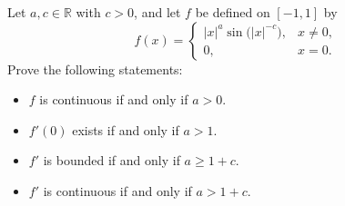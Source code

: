\documentclass{article}
\begin{document}
\begin{problem}[5-13]
Let $a,c\in\mathbb{R}$ with $c>0$, and let $f$ be defined on $[-1,1]$ by
\[
f(x)=
\begin{cases}
|x|^a\sin\bigl(|x|^{-c}\bigr), & x\neq 0,\\
0, & x=0.
\end{cases}
\]
Prove the following statements:
\begin{itemize}
  \item[(a)] $f$ is continuous if and only if $a>0$.
  \item[(b)] $f'(0)$ exists if and only if $a>1$.
  \item[(c)] $f'$ is bounded if and only if $a\ge 1+c$.
  \item[(d)] $f'$ is continuous if and only if $a>1+c$.
\end{itemize}
\end{problem}
\end{document}

